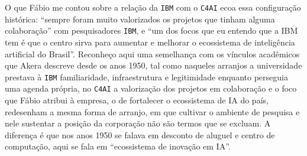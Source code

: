 O que Fábio me contou sobre a relação da \texttt{IBM} com o \texttt{C4AI} ecoa essa configuração histórica: \enquote{sempre foram muito valorizados os projetos que tinham alguma colaboração} com pesquisadores \texttt{IBM}, e \enquote{um dos focos que eu entendo que a IBM tem é que o centro sirva para aumentar e melhorar o ecossistema de inteligência artificial do Brasil}. Reconheço aqui uma semelhança com os vínculos acadêmicos que Akera descreve desde os anos 1950, tal como naqueles arranjos a universidade prestava à \texttt{IBM} familiaridade, infraestrutura e legitimidade enquanto perseguia uma agenda própria, no \texttt{C4AI} a valorização dos projetos em colaboração e o foco que Fábio atribui à empresa, o de fortalecer o ecossistema de IA do país, redesenham a mesma forma de arranjo, em que cultivar o ambiente de pesquisa e nele sustentar a posição da corporação não são termos que se excluam. A diferença é que nos anos 1950 se falava em desconto de aluguel e centro de computação, aqui se fala em \enquote{ecossistema de inovação em IA}.

